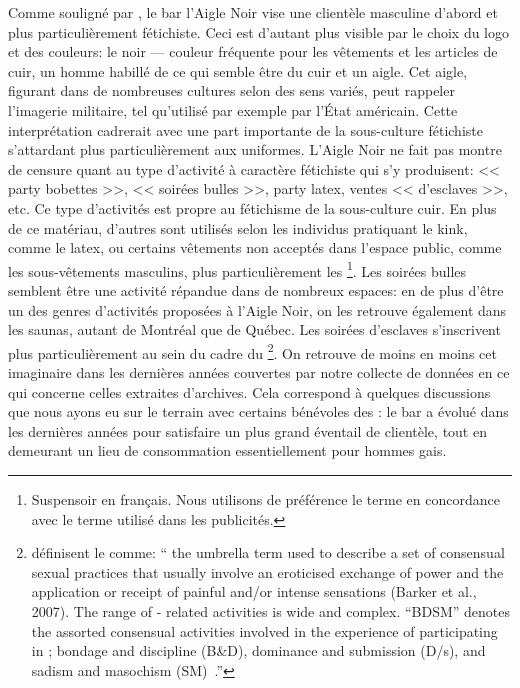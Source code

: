 Comme souligné par \citet{Giraud2013a}, le bar l'Aigle Noir vise une clientèle masculine d'abord et plus particulièrement fétichiste.
Ceci est d'autant plus visible par le choix du logo et des couleurs: le noir --- couleur fréquente pour les vêtements et les articles de cuir, un homme habillé de ce qui semble être du cuir et un aigle.
Cet aigle, figurant dans de nombreuses cultures selon des sens variés, peut rappeler l'imagerie militaire, tel qu'utilisé par exemple par l'État américain.
Cette interprétation cadrerait avec une part importante de la sous-culture fétichiste s'attardant plus particulièrement aux uniformes.
L'Aigle Noir ne fait pas montre de censure quant au type d'activité à caractère fétichiste qui s'y produisent: << party bobettes >>, << soirées bulles >>, party latex, ventes << d'esclaves >>, etc.
Ce type d'activités est propre au fétichisme de la sous-culture cuir.
En plus de ce matériau, d'autres sont utilisés selon les individus pratiquant le kink, comme le latex, ou certains vêtements non acceptés dans l'espace public, comme les sous-vêtements masculins, plus particulièrement les \footnote{Suspensoir en français. Nous utilisons de préférence le terme  en concordance avec le terme utilisé dans les publicités. }.
Les soirées bulles semblent être une activité répandue dans de nombreux espaces: en de plus d'être un des genres d'activités proposées à l'Aigle Noir, on les retrouve également dans les saunas, autant de Montréal que de Québec.
Les soirées d'esclaves s'inscrivent plus particulièrement au sein du cadre du \bdsm{}\footnote{\citeauthor{ Turley2015} définisent le \bdsm{} comme: \foreignquote{ english}{\textelp{} the umbrella term used to describe a set of consensual sexual practices that usually involve an eroticised exchange of power and the application or receipt of painful and/or intense sensations (Barker et al., 2007).
    The range of \bdsm{}- related activities is wide and complex.
“BDSM” denotes the assorted consensual activities involved in the experience of participating in \bdsm{}; bondage and discipline (B\&D), dominance and submission (D/s), and sadism and masochism (SM)~\citeyearpar[24]{Turley2015}.}}.
On retrouve de moins en moins cet imaginaire dans les dernières années couvertes par notre collecte de données en ce qui concerne celles extraites d'archives.
Cela correspond à quelques discussions que nous ayons eu sur le terrain avec certains bénévoles des \agq{}: le bar a évolué dans les dernières années pour satisfaire un plus grand éventail de clientèle, tout en demeurant un lieu de consommation essentiellement pour hommes gais.

